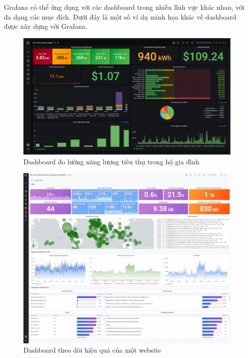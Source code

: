 Grafana có thể ứng dụng với các dashboard trong nhiều lĩnh vực khác nhau, với đa dạng các mục đích. Dưới đây là một số ví dụ minh họa khác về dashboard được xây dựng với Grafana.

\begin{figure}[H] %
    \centering %
    \includegraphics[width=1\textwidth]{figures/Grafana8_HomeEnergy.jpg} 
    \caption{Dashboard đo lường năng lượng tiêu thụ trong hộ gia đình} %
    \label{fig:fig_01}
\end{figure}

\begin{figure}[H] %
    \centering %
    \includegraphics[width=1\textwidth]{figures/Grafana8_WebsitePerformance.jpg} 
    \caption{Dashboard theo dõi hiệu quả của một website} %
    \label{fig:fig_01}
\end{figure}


